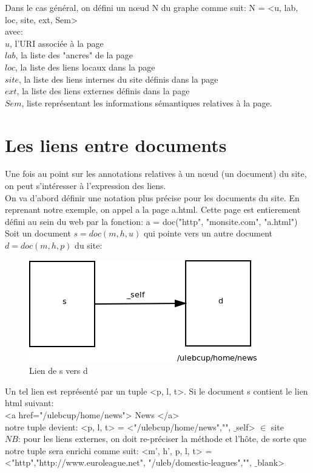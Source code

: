 \documentclass[a4paper]{report}
\begin{document}
Dans le cas général, on défini un nœud N du graphe comme suit: N = <u, lab, loc, site, ext, Sem>\\
 avec:\\
 $u$, l'URI associée à la page\\
 $lab$, la liste des "ancres" de la page\\
 $loc$, la liste des liens locaux dans la page\\
 $site$, la liste des liens internes du site définis dans la page\\
 $ext$, la liste des liens externes définis dans la page\\
 $Sem$, liste représentant les informations sémantiques relatives à la page.\\
 
\section{ Les liens entre documents\\ }
Une fois au point sur les annotations relatives à un nœud (un document) du site, on peut s'intéresser à l'expression des liens.\\
On va d'abord définir une notation plus précise pour les documents du site. En reprenant notre exemple, on appel a la page a.html. Cette page est entierement défini au sein du web par la fonction: a = doc("http", "monsite.com", "a.html")\\
Soit un document $s = doc(m,h,u)$ qui pointe vers un autre document $d = doc(m,h,p)$ du site:\\

\begin{figure}[position]
   \includegraphics[scale=0.6]{lienSimple.png}
   \caption{\label{étiquette} Lien de s vers d}
\end{figure}
Un tel lien est représenté par un tuple <p, l, t>. Si le document s contient le lien html suivant:\\
<a href="/ulebcup/home/news"> News </a>\\
notre tuple devient: <p, l, t> = <"/ulebcup/home/news","", $\_$self> $\in$ site\\
$NB$: pour les liens externes, on doit re-préciser la méthode et l’hôte, de sorte que notre tuple sera enrichi comme suit: <m', h', p, l, t> = <"http","http://www.euroleague.net",
"/uleb/domestic-leagues","", $\_$blank>\\
\end{document}
